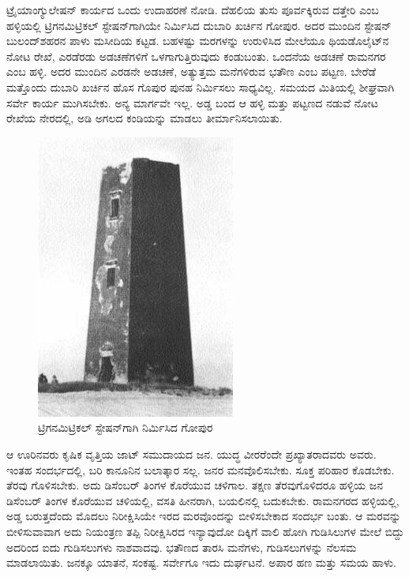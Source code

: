 ಟ್ರೈಯಾಂಗ್ಯುಲೇಷನ್​ ಕಾರ್ಯದ ಒಂದು ಉದಾಹರಣೆ ನೋಡಿ. ದೆಹಲಿಯ ತುಸು ಪೂರ್ವಕ್ಕಿರುವ ದತ್ತೇರಿ ಎಂಬ ಹಳ್ಳಿಯಲ್ಲಿ ಟ್ರಿಗನಮಿಟ್ರಿಕಲ್​ ಸ್ಟೇಷನ್​ಗಾಗಿಯೇ ನಿರ್ಮಿಸಿದ ದುಬಾರಿ ಖರ್ಚಿನ ಗೋಪುರ. ಅದರ ಮುಂದಿನ ಸ್ಟೇಷನ್​ ಬುಲಂದ್​ಶಹರನ ಪಾಳು ಮಸೀದಿಯ ಕಟ್ಟಡ. ಬಹಳಷ್ಟು ಮರಗಳನ್ನು ಉರುಳಿಸಿದ ಮೇಲೆಯೂ ಥಿಯಡೊಲೈಟ್​ನ ನೋಟ ರೇಖೆ, ಎರಡೆರಡು ಅಡಚಣೆಗಳಿಗೆ ಒಳಗಾಗುತ್ತಿರುವುದು ಕಂಡುಬಂತು. ಒಂದನೆಯ ಅಡಚಣೆ ರಾಮನಗರ ಎಂಬ ಹಳ್ಳಿ. ಅದರ ಮುಂದಿನ ಎರಡನೇ ಅಡಚಣೆ, ಅತ್ಯುತ್ತಮ ಮನೆಗಳಿರುವ ಭತೌಣ ಎಂಬ ಪಟ್ಟಣ. ಬೇರೆಡೆ ಮತ್ತೊಂದು ದುಬಾರಿ ಖರ್ಚಿನ ಹೊಸ ಗೊಪುರ ಪುನಹ ನಿರ್ಮಿಸಲು ಸಾಧ್ಯವಿಲ್ಲ. ಸಮಯದ ಮಿತಿಯಲ್ಲಿ ಶೀಘ್ರವಾಗಿ ಸರ್ವೇ ಕಾರ್ಯ ಮುಗಿಸಬೇಕು. ಅನ್ಯ ಮಾರ್ಗವೇ ಇಲ್ಲ. ಅಡ್ಡ ಬಂದ ಆ ಹಳ್ಳಿ ಮತ್ತು ಪಟ್ಟಣದ ನಡುವೆ ನೋಟ ರೇಖೆಯ ನೇರದಲ್ಲಿ,  ಅಡಿ ಅಗಲದ ಕಂಡಿಯನ್ನು ಮಾಡಲು ತೀರ್ಮಾನಿಸಲಾಯಿತು.

\newpage

\begin{figure}[!htbp]
\includegraphics[scale=1.05]{"images/image015.jpg"}
\caption{ಟ್ರಿಗನಮಿಟ್ರಿಕಲ್​ ಸ್ಟೇಷನ್‌ಗಾಗಿ ನಿರ್ಮಿಸಿದ ಗೋಪುರ}\label{chap12-fig1}
\end{figure}

\vskip 4pt

ಆ ಊರಿನವರು ಕೃಷಿಕ ವೃತ್ತಿಯ ಜಾಟ್​ ಸಮುದಾಯದ ಜನ. ಯುದ್ಧ ವೀರರೆಂದೇ ಪ್ರಖ್ಯಾತರಾದವರು ಅವರು. ಇಂತಹ ಸಂದರ್ಭದಲ್ಲಿ, ಬರಿ ಕಾನೂನಿನ ಬಲಾತ್ಕಾರ ಸಲ್ಲ. ಜನರ ಮನವೊಲಿಸಬೇಕು. ಸೂಕ್ತ ಪರಿಹಾರ ಕೊಡಬೇಕು. ತೆರವು ಗೊಳಿಸಬೇಕು. ಅದು ಡಿಸೆಂಬರ್​ ತಿಂಗಳ ಕೊರೆಯುವ ಚಳಿಗಾಲ. ತಕ್ಷಣ ತೆರವುಗೊಳಿದರೂ ಹಳ್ಳಿಯ ಜನ ಡಿಸೆಂಬರ್​ ತಿಂಗಳ ಕೊರೆಯುವ ಚಳಿಯಲ್ಲಿ, ವಸತಿ ಹೀನರಾಗಿ, ಬಯಲಿನಲ್ಲಿ ಬದುಕಬೇಕು. ರಾಮನಗರದ ಹಳ್ಳಿಯಲ್ಲಿ, ಅಡ್ಡ ಬರುತ್ತದೆಂದು ಮೊದಲು ನಿರೀಕ್ಷಿಸಿಯೇ ಇರದ ಮರವೊಂದನ್ನು ಬೀಳಿಸಬೇಕಾದ ಸಂದರ್ಭ ಬಂತು. ಆ ಮರವನ್ನು ಬೀಳಿಸುವಾವಾಗ ಅದು ನಿಯಂತ್ರಣ ತಪ್ಪಿ ನಿರೀಕ್ಷಿಸಿರದ ಇನ್ಯಾವುದೋ ದಿಕ್ಕಿಗೆ ವಾಲಿ ಹೋಗಿ ಗುಡಿಸಿಲುಗಳ ಮೇಲೆ ಬಿದ್ದು ಅದರಿಂದ ಐದು ಗುಡಿಸಲುಗಳು ನಾಶವಾದವು. ಭತೌಣದ  ತಾರಸಿ ಮನೆಗಳು,  ಗುಡಿಸಲುಗಳನ್ನು ನೆಲಸಮ ಮಾಡಲಾಯಿತು. ಜನಕ್ಕೂ ಯಾತನೆ, ಸಂಕಷ್ಟ. ಸರ್ವೇಗೂ ಇದು ದುರ್ಘಟನೆ. ಅಪಾರ ಹಣ ಮತ್ತು ಸಮಯ ಹಾಳು.

